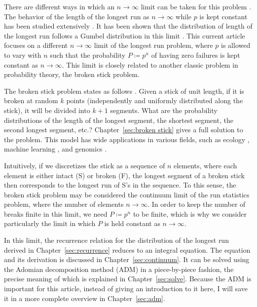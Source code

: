 \documentclass[oneside,12pt,final]{ucthesis-CA2012}
\newcommand{\ceq}{\coloneqq}
\begin{document}
\begin{mainmatter}
There are different ways in which an $n\to\infty$ limit can be taken for this problem
\cite[pp.~29--33]{Balakrishnan_Koutras_2002}.
The behavior of the length of the longest run as $n\to\infty$ while $p$ is kept constant
has been studied extensively \cite{revesz1978strong}.
It has been shown that the distribution of length of the longest run
follows a Gumbel distribution in this limit \cite{Gordon_Schilling_Waterman_1986}.
This current article focuses on a different $n\to\infty$ limit of the longest run problem,
where $p$ is allowed to vary with $n$ such that the probability $P\ceq p^n$
of having zero failures is kept constant as $n\to\infty$.
This limit is closely related to another classic problem in probability theory,
the broken stick problem.

The broken stick problem states as follows \cite{Holst_1980}.
Given a stick of unit length, if it is broken at random $k$ points
(independently and uniformly distributed along the stick),
it will be divided into $k+1$ segments.
What are the probability distributions of the length of the longest segment,
the shortest segment, the second longest segment, etc.?
Chapter~\ref{sec:broken stick} gives a full solution to the problem.
This model has wide applications in various fields,
such as ecology \cite{Cohen_2020}, machine learning \cite{pmlr-v37-das15},
and genomics \cite{Titus-McQuillan_Nanni_McIntyre_Rogers_2023}.

Intuitively, if we discretizes the stick as a sequence of $n$ elements,
where each element is either intact (S) or broken (F),
the longest segment of a broken stick then corresponds to the longest run of S's in the sequence.
To this sense, the broken stick problem may be considered the continuum limit
of the run statistics problem, where the number of elements $n\to\infty$.
In order to keep the number of breaks finite in this limit, we need $P\ceq p^n$ to be finite,
which is why we consider particularly the limit in which $P$ is held constant as $n\to\infty$.

In this limit, the recurrence relation for the distribution of the longest run
derived in Chapter~\ref{sec:recurrence} reduces to an integral equation.
The equation and its derivation is discussed in Chapter~\ref{sec:continuum}.
It can be solved using the Adomian decomposition method (ADM) in a piece-by-piece fashion,
the precise meaning of which is explained in Chapter~\ref{sec:solve}.
Because the ADM is important for this article, instead of giving an introduction to it here,
I will save it in a more complete overview in Chapter~\ref{sec:adm}.


\end{mainmatter}
\end{document}
